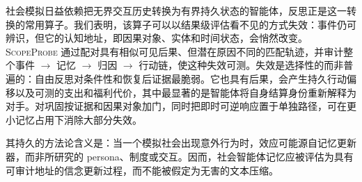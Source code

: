 \documentclass[UTF8,11pt]{ctexart}
\newcommand{\method}{\textsc{ScopeProbe}}
\begin{document}
社会模拟日益依赖把无界交互历史转换为有界持久状态的智能体，反思正是这一转换的常用算子。我们表明，该算子可以以结果级评估看不见的方式失效：事件仍可辨识，但它的认知地址，即因果对象、实体和时间状态，会悄然改变。\method{} 通过配对具有相似可见后果、但潜在原因不同的匹配轨迹，并审计整个事件 $\rightarrow$ 记忆 $\rightarrow$ 归因 $\rightarrow$ 行动链，使这种失效可测。失效是选择性的而非普遍的：自由反思对条件性和恢复后证据最脆弱。它也具有后果，会产生持久行动偏移以及可测的支出和福利代价，其中最显著的是智能体将自身结算身份重新解释为对手。对巩固按证据和因果对象加门，同时把即时可逆响应置于单独路径，可在更小记忆占用下消除大部分失效。

其持久的方法论含义是：当一个模拟社会出现意外行为时，效应可能源自记忆更新器，而非所研究的 persona、制度或交互。因而，社会智能体记忆应被评估为具有可审计地址的信念更新过程，而不能被假定为无害的文本压缩。



\end{document}

